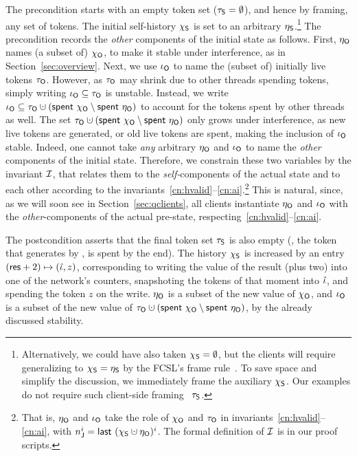 %
The precondition starts with an empty token set ($\tau_{\mathsf{S}} = \emptyset$),
and hence by framing, any set of tokens. The initial self-history
$\chi_{\mathsf{S}}$ is set to an arbitrary $\eta_{\mathsf{S}}$.\footnote{Alternatively, we
  could have also taken $\chi_{\mathsf{S}} = \emptyset$, but the clients will
  require generalizing to $\chi_{\mathsf{S}} = \eta_{\mathsf{S}}$ by the FCSL's frame
  rule~\cite{Sergey-al:ESOP15}. To save space and simplify the
  discussion, we immediately frame \wrt the auxiliary $\chi_{\mathsf{S}}$. Our
  examples do not require such client-side framing \wrt~$\tau_{\mathsf{S}}$.} The
precondition records the \emph{other} components of the initial state
as follows. First, $\eta_{\mathsf{O}}$ names (a subset of) $\chi_{\mathsf{O}}$, to make it
stable under interference, as in Section~\ref{sec:overview}. Next, we
use $\iota_{\mathsf{O}}$ to name the (subset of) initially live tokens
$\tau_{\mathsf{O}}$. However, as $\tau_{\mathsf{O}}$ may shrink due to other threads spending
tokens, simply writing $\iota_{\mathsf{O}} \subseteq \tau_{\mathsf{O}}$ is unstable. Instead,
we write $\ikno \subseteq \tkno \hunion (\Tomb~\histo \setminus
\Tomb~\gisto)$ to account for the tokens spent by other threads as
well. The set $\tkno \hunion (\Tomb~\histo \setminus \Tomb~\gisto)$
only grows under interference, as new live tokens are generated, or
old live tokens are spent, making the inclusion of $\iota_{\mathsf{O}}$ stable.
%
Indeed, one cannot take \emph{any} arbitrary $\eta_{\mathsf{O}}$ and $\iota_{\mathsf{O}}$ to
name the \emph{other} components of the initial state. Therefore, we
constrain these two variables by the invariant $\mathcal{I}$, that relates
them to the \emph{self-}components of the actual state and to each
other according to the
invariants~\ref{cn:hvalid}--\ref{cn:ai}.\footnote{That is, $\eta_{\mathsf{O}}$
  and $\iota_{\mathsf{O}}$ take the role of $\chi_{\mathsf{O}}$ and $\tau_{\mathsf{O}}$ in
  invariants~\ref{cn:hvalid}--\ref{cn:ai}, with $n^i_\joint =
  \last~(\hists \hunion \gisto)^i$. The formal definition of $\mathcal{I}$ is
  in our proof scripts.} This is natural, since, as we will soon see
in Section~\ref{sec:qclients}, all clients instantiate $\eta_{\mathsf{O}}$ and
$\iota_{\mathsf{O}}$ with the \emph{other}-components of the actual pre-state,
respecting~\ref{cn:hvalid}--\ref{cn:ai}.
%

The postcondition asserts that the final token set $\tau_{\mathsf{S}}$ is also
empty (\ie, the token that  generates by ,
is spent by the end). The history $\chi_{\mathsf{S}}$ is increased by an entry
$(\mathsf{res} + 2) \mapsto (\hat{\iota}, z)$, corresponding to writing the value of
the result (plus two) into one of the network's counters, snapshoting
the tokens of that moment into $\hat{\iota}$, and spending the token $z$ on
the write. $\eta_{\mathsf{O}}$ is a subset of the new value of $\chi_{\mathsf{O}}$, and
$\iota_{\mathsf{O}}$ is a subset of the new value of $\tkno \hunion (\Tomb~\histo
\setminus \Tomb~\gisto)$, by the already discussed stability.


